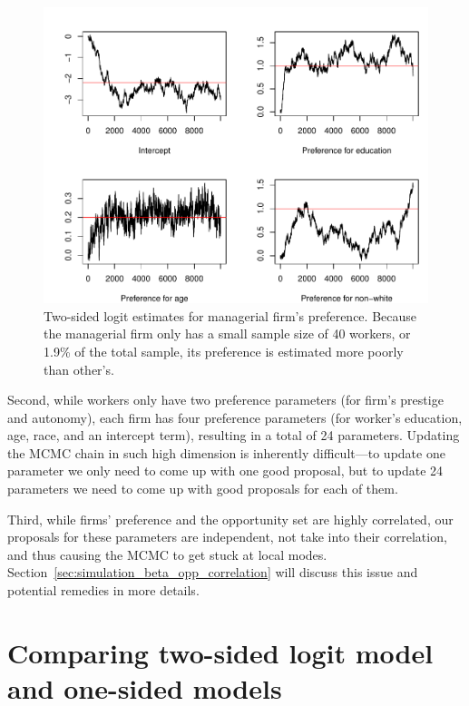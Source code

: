 \begin{figure}[tbp]
  \centering
  \includegraphics[width=\textwidth,keepaspectratio]{../figure/sim_labor_nojobs_beta_emp3}
  \caption[Simulation, poor mixing due to small sample size.]{Two-sided logit
    estimates for managerial firm's preference. Because the managerial firm only
    has a small sample size of 40 workers, or 1.9\% of the total sample, its
    preference is estimated more poorly than other's.}
  \label{fig:sim_labor_nojobs_beta_emp3}
\end{figure}

Second, while workers only have two preference parameters (for firm's prestige
and autonomy), each firm has four preference parameters (for worker's education,
age, race, and an intercept term), resulting in a total of 24 parameters.
Updating the MCMC chain in such high dimension is inherently difficult---to
update one parameter we only need to come up with one good proposal, but to
update 24 parameters we need to come up with good proposals for each of them.

Third, while firms' preference and the opportunity set are highly correlated,
our proposals for these parameters are independent, not take into their
correlation, and thus causing the MCMC to get stuck at local modes.
Section~\ref{sec:simulation_beta_opp_correlation} will discuss this issue and
potential remedies in more details.

\section{Comparing two-sided logit model and one-sided models}

